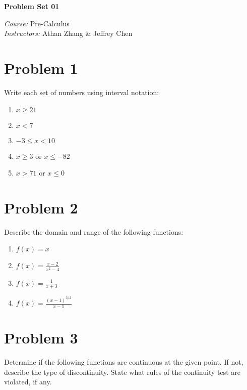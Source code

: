 \documentclass[tikz,border=10pt]{article}
\newcommand{\course}{Pre-Calculus}
\newcommand{\instructor}{Athan Zhang \& Jeffrey Chen}
\begin{document}
\begin{center}
\textbf{\Huge Problem Set 01} %
\end{center}

\begin{flushleft}
\emph{Course:} \course \\
\emph{Instructors:} \instructor \\
\end{flushleft}

\section*{Problem 1}

Write each set of numbers using interval notation: 

\begin{enumerate}
    \item $x \geq 21$
    \item $x < 7$
    \item $-3 \leq x < 10$
    \item $x \geq 3$ or $x \leq -82$
    \item $x > 71$ or $x \leq 0$
\end{enumerate}

\section*{Problem 2}

Describe the domain and range of the following functions:

\begin{enumerate}
    \item $f(x) = x$
    \item $f(x) = \frac{x-2}{x^{2} - 4}$
    \item $f(x) = \frac{1}{x+3}$
    \item $f(x) = \frac{(x-1)^{3/2}}{x-1}$
\end{enumerate}

\section*{Problem 3}

Determine if the following functions are continuous at the given point. If not, describe the type of discontinuity. State what rules of the continuity test are violated, if any.
\end{document}
